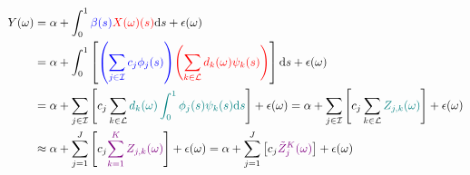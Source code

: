\documentclass[11pt,twoside,a4paper]{article}
\begin{document}
	\begin{equation}
		\begin{split}
			Y(\omega) & = \alpha + \int_{0}^{1} {\color{blue}\beta(s)} {\color{red}X(\omega)(s)}\mathrm{d}s + \epsilon(\omega) \\
			& = \alpha + \int_{0}^{1}\left[{\color{blue}\left(\sum_{j \in \mathcal{I}} c_j  \phi_j(s)\right)} {\color{red}\left(\sum_{k \in \mathcal{L}} d_k(\omega)  \psi_k(s)\right)} \right]\mathrm{d}s + \epsilon(\omega) \\
			& = \alpha + \sum_{j \in \mathcal{I}} \left[ c_j \sum_{k \in \mathcal{L}} \textcolor{teal}{d_k(\omega) \int_{0}^{1} \phi_j(s) \psi_k(s) \mathrm{d}s}\right] + \epsilon(\omega)
			= \alpha + \sum_{j \in \mathcal{I}} \left[c_j \sum_{k \in \mathcal{L}}  \textcolor{teal}{Z_{j, k}(\omega)} \right] + \epsilon(\omega) \\
			& \approx \alpha + \sum_{j = 1}^{J} \left[c_j \textcolor{violet}{\sum_{k = 1}^{K}  Z_{j, k}(\omega)} \right] + \epsilon(\omega)
			= \alpha + \sum_{j = 1}^{J} \left[c_j \textcolor{violet}{\tilde{Z}_{j}^{K}(\omega)} \right] + \epsilon(\omega)	
		\end{split}
	\end{equation}
	
\end{document}
